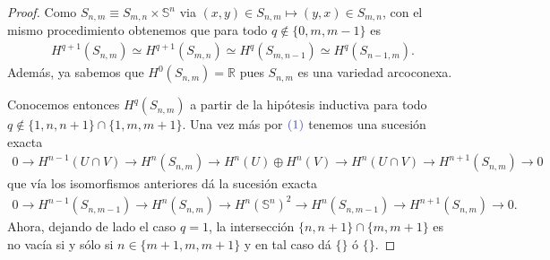 \documentclass[11pt]{article}
\newcommand{\R}{\mathbb{R}}
\newcommand{\Ss}{\mathbb{S}}
\newcommand{\paint}[1]{\color{color}{#1}}
\begin{document}
\begin{proof}
Como $S_{n,m} \equiv S_{m,n} \times \Ss^n$ via $(x,y) \in S_{n,m} \mapsto (y,x) \in S_{m,n}$, con el mismo procedimiento obtenemos que para todo $q \not \in \{0,m,m-1\}$ es
\begin{align*}
H^{q+1}(S_{n,m}) \simeq H^{q+1}(S_{m,n}) \simeq H^{q}(S_{m,n-1}) \simeq H^{q}(S_{n-1,m}).
\end{align*}
Además, ya sabemos que $H^0(S_{n,m}) = \R$ pues $S_{n,m}$ es una variedad arcoconexa. 

Conocemos  entonces $H^q(S_{n,m})$ a partir de la hipótesis inductiva para todo $q \not \in \{1,n,n+1\} \cap \{1,m,m+1\}$. Una vez más por $\paint{(1)}$ tenemos una sucesión exacta
\begin{align*}
 0 \to H^{n-1}(U \cap V) \to H^{n}(S_{n,m}) \to H^{n}(U) \oplus H^{n}(V) \to H^{n}(U \cap V) \to H^{n+1}(S_{n,m}) \to 0
\end{align*}
que vía los isomorfismos anteriores dá la sucesión exacta
\begin{align*}
 0 \to H^{n-1}(S_{n,m-1}) \to H^{n}(S_{n,m}) \to H^{n}(\Ss^n)^2 \to H^{n}(S_{n,m-1}) \to H^{n+1}(S_{n,m}) \to 0.
\end{align*}
Ahora, dejando de lado el caso $q=1$, la intersección $\{n,n+1\} \cap \{m,m+1\}$ es no vacía si y sólo si $n \in \{m+1, m,m+1\}$ y en tal caso dá $\{\}$ ó $\{\}$.
\end{proof}
\end{document}
